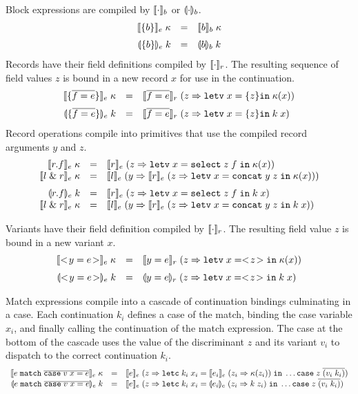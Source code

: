 \documentclass[11pt]{article}
\begin{document}
Block expressions are compiled by $\llbracket \cdot \rrbracket_b$ or $\llparenthesis \cdot \rrparenthesis_b$.
\[
\begin{array}{rcll}
\cmpk{e}{\blke{b}} & = &
  \cmpin{b}{b}{\kappa} \medskip \\

\tcmpk{e}{\blke{b}} & = &
  \tcmpin{b}{b}{k} \\
\end{array}
\]
Records have their field definitions compiled by $\llbracket \cdot \rrbracket_r$.
The resulting sequence of field values $z$ is bound in a new record $x$ for use in the continuation.
\[
\begin{array}{rcll}
\cmpk{e}{\rece{f}{e}} & = &
  \cmpin{r}{\flds{f}{e}}{(z => \letv{x}{\recvs{z}}{\kappa(x)})} \medskip \\

\tcmpk{e}{\rece{f}{e}} & = &
  \cmpin{r}{\flds{f}{e}}{(z => \letv{x}{\recvs{z}}{\appc{k}{x}})} \\
\end{array}
\]
Record operations compile into primitives that use the compiled record arguments $y$ and $z$.
\[
\begin{array}{rcll}
\cmpk{e}{\sele{r}{f}} & = &
  \cmpin{e}{r}{(z => \letv{x}{\selv{z}{f}}{\kappa(x)})} \\
\cmpk{e}{\ande{l}{r}} & = &
  \cmpin{e}{l}{(y => \cmpin{e}{r}{(z => \letv{x}{\andv{y}{z}}{\kappa(x)})})} \medskip \\

\tcmpk{e}{\sele{r}{f}} & = &
  \cmpin{e}{r}{(z => \letv{x}{\selv{z}{f}}{\appc{k}{x}})} \\
\cmpk{e}{\ande{l}{r}} & = &
  \cmpin{e}{l}{(y => \cmpin{e}{r}{(z => \letv{x}{\andv{y}{z}}{\appc{k}{x}})})} \\
\end{array}
\]

Variants have their field definition compiled by $\llbracket \cdot \rrbracket_r$.
The resulting field value $z$ is bound in a new variant $x$.
\[
\begin{array}{rcll}
\cmpk{e}{\vare{y}{e}} & = &
  \cmpin{r}{\flde{y}{e}}{(z => \letv{x}{\varv{z}}{\kappa(x)})} \medskip \\

\tcmpk{e}{\vare{y}{e}} & = &
  \tcmpin{r}{\flde{y}{e}}{(z => \letv{x}{\varv{z}}{\appc{k}{x}})}
\end{array}
\]

Match expressions compile into a cascade of continuation bindings culminating in a case.
Each continuation $k_i$ defines a case of the match, binding the case variable $x_i$, and finally calling the continuation of the match expression.
The case at the bottom of the cascade uses the value of the discriminant $z$ and its variant $v_i$ to dispatch to the correct continuation $k_i$.
\[
\begin{array}{rcll}
\cmpk{e}{\mate{e}{\repo{\case{v}{x}{e}}}} & = &
  \cmpin{e}{e}{(z => \letc{k_i}{x_i}{\cmpin{e}{e_i}{(z_i => \kappa(z_i))}}
    \ldots \casv{z}{v_i}{k_i}
  )} \\ \medskip

\tcmpk{e}{\mate{e}{\repo{\case{v}{x}{e}}}} & = &
  \cmpin{e}{e}{(z => \letc{k_i}{x_i}{\tcmpin{e}{e_i}{(z_i => \appc{k}{z_i})}}
    \ldots \casv{z}{v_i}{k_i}
  )}
\end{array}
\]
\end{document}
